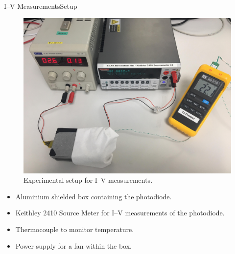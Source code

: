 \documentclass{beamer}
\begin{document}
    \begin{frame}{I--V Measurements}{Setup}
        \begin{minipage}{0.6\linewidth}
        \begin{figure}
            \centering
            \includegraphics[width = \linewidth]{IV_Setup.jpg}
            \caption{Experimental setup for I--V measurements.}
        \end{figure}
        \end{minipage}%
        \begin{minipage}{0.4\linewidth}
            \begin{itemize}
                \item Aluminium shielded box containing the photodiode.
                \item Keithley 2410 Source Meter for I--V measurements of the photodiode.
                \item Thermocouple to monitor temperature.
                \item Power supply for a fan within the box.
            \end{itemize}
        \end{minipage}
    \end{frame}
    
\end{document}
